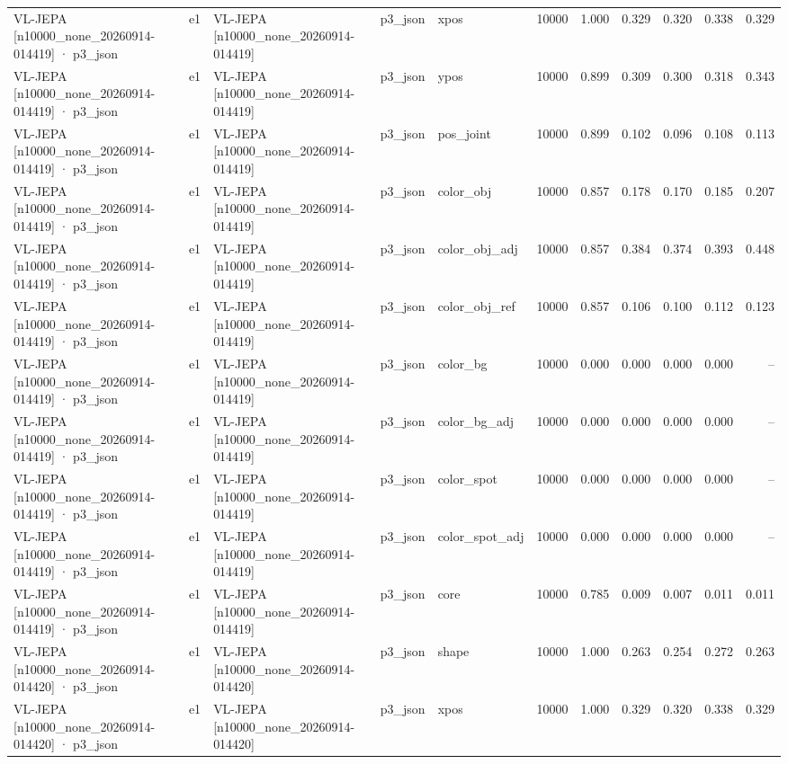 \begin{tabular}{lllllrrrrrr}
VL-JEPA [n10000\_none\_20260914-014419] · p3\_json & e1 & VL-JEPA [n10000\_none\_20260914-014419] & p3\_json & xpos & 10000 & 1.000 & 0.329 & 0.320 & 0.338 & 0.329 \\
VL-JEPA [n10000\_none\_20260914-014419] · p3\_json & e1 & VL-JEPA [n10000\_none\_20260914-014419] & p3\_json & ypos & 10000 & 0.899 & 0.309 & 0.300 & 0.318 & 0.343 \\
VL-JEPA [n10000\_none\_20260914-014419] · p3\_json & e1 & VL-JEPA [n10000\_none\_20260914-014419] & p3\_json & pos\_joint & 10000 & 0.899 & 0.102 & 0.096 & 0.108 & 0.113 \\
VL-JEPA [n10000\_none\_20260914-014419] · p3\_json & e1 & VL-JEPA [n10000\_none\_20260914-014419] & p3\_json & color\_obj & 10000 & 0.857 & 0.178 & 0.170 & 0.185 & 0.207 \\
VL-JEPA [n10000\_none\_20260914-014419] · p3\_json & e1 & VL-JEPA [n10000\_none\_20260914-014419] & p3\_json & color\_obj\_adj & 10000 & 0.857 & 0.384 & 0.374 & 0.393 & 0.448 \\
VL-JEPA [n10000\_none\_20260914-014419] · p3\_json & e1 & VL-JEPA [n10000\_none\_20260914-014419] & p3\_json & color\_obj\_ref & 10000 & 0.857 & 0.106 & 0.100 & 0.112 & 0.123 \\
VL-JEPA [n10000\_none\_20260914-014419] · p3\_json & e1 & VL-JEPA [n10000\_none\_20260914-014419] & p3\_json & color\_bg & 10000 & 0.000 & 0.000 & 0.000 & 0.000 & -- \\
VL-JEPA [n10000\_none\_20260914-014419] · p3\_json & e1 & VL-JEPA [n10000\_none\_20260914-014419] & p3\_json & color\_bg\_adj & 10000 & 0.000 & 0.000 & 0.000 & 0.000 & -- \\
VL-JEPA [n10000\_none\_20260914-014419] · p3\_json & e1 & VL-JEPA [n10000\_none\_20260914-014419] & p3\_json & color\_spot & 10000 & 0.000 & 0.000 & 0.000 & 0.000 & -- \\
VL-JEPA [n10000\_none\_20260914-014419] · p3\_json & e1 & VL-JEPA [n10000\_none\_20260914-014419] & p3\_json & color\_spot\_adj & 10000 & 0.000 & 0.000 & 0.000 & 0.000 & -- \\
VL-JEPA [n10000\_none\_20260914-014419] · p3\_json & e1 & VL-JEPA [n10000\_none\_20260914-014419] & p3\_json & core & 10000 & 0.785 & 0.009 & 0.007 & 0.011 & 0.011 \\
VL-JEPA [n10000\_none\_20260914-014420] · p3\_json & e1 & VL-JEPA [n10000\_none\_20260914-014420] & p3\_json & shape & 10000 & 1.000 & 0.263 & 0.254 & 0.272 & 0.263 \\
VL-JEPA [n10000\_none\_20260914-014420] · p3\_json & e1 & VL-JEPA [n10000\_none\_20260914-014420] & p3\_json & xpos & 10000 & 1.000 & 0.329 & 0.320 & 0.338 & 0.329 \\

\end{tabular}
